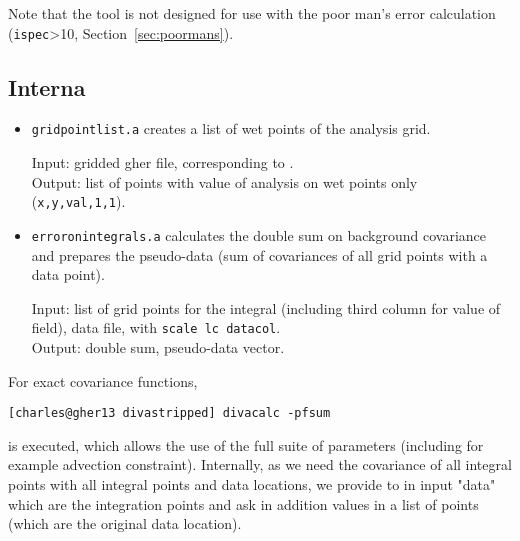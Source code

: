 Note that the tool is not designed for use with the poor man's error calculation (\texttt{ispec}>10, Section~\ref{sec:poormans}).

\subsection{Interna}

\begin{itemize}

\item \texttt{gridpointlist.a} creates a list of wet points of the analysis grid. 

Input:  gridded gher file,  corresponding to .\\ 
Output:  list of points with value of analysis on wet points only (\texttt{x,y,val,1,1}).

\item \texttt{erroronintegrals.a} calculates the double sum on background covariance and prepares the pseudo-data (sum of covariances of all grid points with a  data point).

Input:  list of grid points for the integral (including third column for value of field),  data file,  with \texttt{scale lc datacol}.\\
Output:  double sum,  pseudo-data vector.
\end{itemize}

For exact covariance functions, 

\begin{lstlisting}[style=Bash]
[charles@gher13 divastripped] divacalc -pfsum
\end{lstlisting}

is executed, which allows the use of the full suite of \diva parameters (including for example advection constraint). Internally, as we need the covariance of all integral points with all integral points and data locations, we provide to  in input "data" which are the integration points and ask in addition values in a list of points (which are the original data location).

